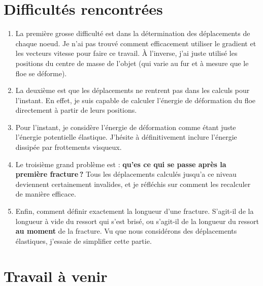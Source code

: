 \documentclass[
  french,
	11pt, %
]{fphw}
\begin{document}
 

\section*{Difficultés rencontrées}


\begin{enumerate}
  \item La première grosse difficulté est dans la détermination des déplacements de chaque noeud. Je n'ai pas trouvé comment efficacement utiliser le gradient et les vecteurs vitesse pour faire ce travail. À l'inverse, j'ai juste utilisé les positions du centre de masse de l'objet (qui varie au fur et à mesure que le floe se déforme).
  \item La deuxième est que les déplacements ne rentrent pas dans les calculs pour l'instant. En effet, je suis capable de calculer l'énergie de déformation du floe directement à partir de leurs positions. 
  \item Pour l'instant, je considère l'énergie de déformation comme étant juste l'énergie potentielle élastique. J'hésite à définitivement inclure l'énergie dissipée par frottements visqueux.
  \item Le troisième grand problème est : \textbf{qu'es ce qui se passe après la première fracture ?} Tous les déplacements calculés jusqu'a ce niveau deviennent certainement invalides, et je réfléchis sur comment les recalculer de manière efficace.  
  \item Enfin, comment définir exactement la longueur d'une fracture. S'agit-il de la longueur à vide du ressort qui s'est brisé, ou s'agit-il de la longueur du ressort \textbf{au moment} de la fracture. Vu que nous considérons des déplacements élastiques, j'essaie de simplifier cette partie.
\end{enumerate}



\section*{Travail à venir}
\end{document}
